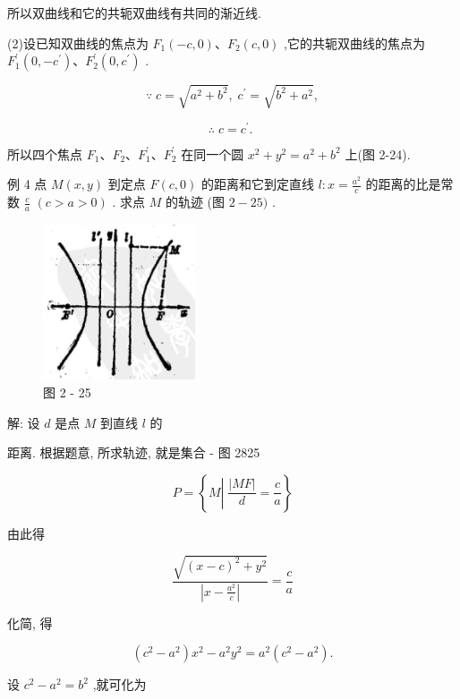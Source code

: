 \documentclass[lang=cn,newtx,10.5pt,scheme=chinese]{elegantbook}
\begin{document}
所以双曲线和它的共轭双曲线有共同的渐近线.

(2)设已知双曲线的焦点为 \({F}_{1}\left( {-c,0}\right) \text{、}{F}_{2}\left( {c,0}\right)\) ,它的共轭双曲线的焦点为 \({F}_{1}^{\prime }\left( {0, - {c}^{\prime }}\right) \text{、}{F}_{2}^{\prime }\left( {0,{c}^{\prime }}\right)\) .

\[
  \because \;c = \sqrt{{a}^{2} + {b}^{2}},\;{c}^{\prime } = \sqrt{{b}^{2} + {a}^{2}},
\]

\[
  \therefore \;c = {c}^{\prime }\text{. }
\]

所以四个焦点 \({F}_{1}\text{、}{F}_{2}\text{、}{F}_{1}^{\prime }\text{、}{F}_{2}^{\prime }\) 在同一个圆 \({x}^{2} + {y}^{2} = {a}^{2} + {b}^{2}\) 上(图 2-24).

例 4 点 \(M\left( {x,y}\right)\) 到定点 \(F\left( {c,0}\right)\) 的距离和它到定直线 \(l : x = \frac{{a}^{2}}{c}\) 的距离的比是常数 \(\frac{c}{a}\) \(\left( {c > a > 0}\right)\) . 求点 \(M\) 的轨迹 (图 \(2 - {25})\) .

\begin{figure}[h]
  \centering
  \includegraphics[max width=0.4\textwidth]{images/01912cc2-ffb6-728e-9ae7-b113ff05c64b_104_910731.jpg}
  \caption{图 2 - 25}
\end{figure}

解: 设 \(d\) 是点 \(M\) 到直线 \(l\) 的

距离. 根据题意, 所求轨迹, 就是集合 - 图 2825

\[
  P = \left\{ {M\left| {\;\frac{\left| MF\right| }{d} = \frac{c}{a}}\right. }\right\}
\]

由此得

\[
  \frac{\sqrt{{\left( x - c\right) }^{2} + {y}^{2}}}{\left| x - \frac{{a}^{2}}{c}\right| } = \frac{c}{a}
\]

化简, 得

\[
  \left( {{c}^{2} - {a}^{2}}\right) {x}^{2} - {a}^{2}{y}^{2} = {a}^{2}\left( {{c}^{2} - {a}^{2}}\right) .
\]

设 \({c}^{2} - {a}^{2} = {b}^{2}\) ,就可化为
\end{document}

